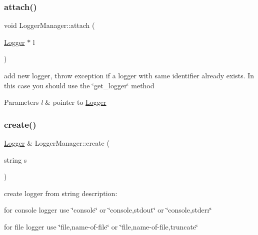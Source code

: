 \subsubsection{\texorpdfstring{attach()}{attach()}}
{\footnotesize\ttfamily void Logger\+Manager\+::attach (\begin{DoxyParamCaption}\item[{\hyperlink{classez_1_1logging_1_1Logger}{Logger} $\ast$}]{l }\end{DoxyParamCaption})}

add new logger, throw exception if a logger with same identifier already exists. In this case you should use the \char`\"{}get\+\_\+logger\char`\"{} method 
\begin{DoxyParams}{Parameters}
{\em l} & pointer to \hyperlink{classez_1_1logging_1_1Logger}{Logger} \\
\hline
\end{DoxyParams}
\mbox{\label{classez_1_1logging_1_1LoggerManager_aba82648266530bd33f74d865c4c55878}} 
\subsubsection{\texorpdfstring{create()}{create()}}
{\footnotesize\ttfamily \hyperlink{classez_1_1logging_1_1Logger}{Logger} \& Logger\+Manager\+::create (\begin{DoxyParamCaption}\item[{string}]{s }\end{DoxyParamCaption})}

create logger from string description\+: 
\begin{DoxyItemize}
\item for console logger use \char`\"{}console\char`\"{} or \char`\"{}console,stdout\char`\"{} or \char`\"{}console,stderr\char`\"{} 
\item for file logger use \char`\"{}file,name-\/of-\/file\char`\"{} or \char`\"{}file,name-\/of-\/file,truncate\char`\"{} 
\end{DoxyItemize}\mbox{\label{classez_1_1logging_1_1LoggerManager_a777dcb9907e2d3cc7a314df6617ba5fb}} 

